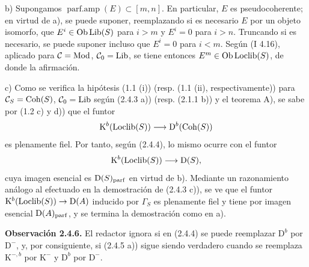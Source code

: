 b) Supongamos $\operatorname{parf.amp}(E)\subset[m,n]$. En particular, $E$ es pseudocoherente; en virtud de a), se puede suponer, reemplazando si es necesario $E$ por un objeto isomorfo, que $E^i\in\Ob\Lib(S)$ para $i>m$ y $E^i=0$ para $i>n$. Truncando si es necesario, se puede suponer incluso que $E^i=0$ para $i<m$. Según (I 4.16), aplicado para $\mathcal C=\Mod$, $\mathcal C_0=\Lib$, se tiene entonces $E^m\in\sisi{\Ob\Loclib(S))}{\Ob\Loclib(S)}$, de donde la afirmación.

c) Como se verifica la hipótesis (1.1 (i)) (resp. (1.1 (ii), respectivamente)) para $\mathcal C_S=\Coh(S)$, $\mathcal C_0=\Lib$ según (2.4.3 a)) (resp. (2.1.1 b)) y el teorema A), se sabe por (1.2 c) y d)) que el funtor
\[
\mathrm K^b(\Loclib(S))\longrightarrow\mathrm D^b(\Coh(S))
\]
es plenamente fiel. Por tanto, según (2.4.4), lo mismo ocurre con el funtor
\[
\mathrm K^b(\Loclib(S))\longrightarrow\mathrm D(S),
\]
cuya imagen esencial es $\mathrm D(S)_{\parf}$ en virtud de b). Mediante un razonamiento análogo al efectuado en la demostración de (2.4.3 c)), se ve que el funtor $\mathrm K^b(\Loclib(S))\to\sisi{\mathrm D(S)}{\mathrm D(A)}$ inducido por $\Gamma_S$ es plenamente fiel y tiene por imagen esencial $\sisi{\mathrm D(S)_{\parf}}{\mathrm D(A)_{\parf}}$, y se termina la demostración como en a).

\textbf{Observación 2.4.6.} El redactor ignora si en (2.4.4) se puede reemplazar $\mathrm D^b$ por $\mathrm D^{-}$, y, por consiguiente, si (2.4.5 a)) sigue siendo verdadero cuando se reemplaza $\mathrm K^{-,b}$ por $\mathrm K^{-}$ y $\mathrm D^b$ por $\mathrm D^{-}$.

